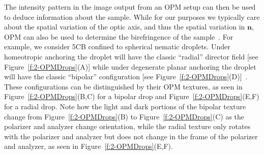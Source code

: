 The intensity pattern in the image output from an OPM setup can then be used to deduce information about the sample.
While for our purposes we typically care about the spatial variation of the optic axis, and thus the spatial variation in $\mathbf{n}$, OPM can also be used to determine the birefringence of the sample~\cite{RN232}.
For example, we consider 5CB confined to spherical nematic droplets.
Under homeotropic anchoring the droplet will have the classic ``radial'' director field [see Figure~\ref{f:2-OPMDrops}(A)] while under degenerate planar anchoring the droplet will have the classic ``bipolar'' configuration [see Figure~\ref{f:2-OPMDrops}(D)]~\cite{RN177}.
These configurations can be distinguished by their OPM textures, as seen in Figure~\ref{f:2-OPMDrops}(B,C) for a bipolar drop and Figure~\ref{f:2-OPMDrops}(E,F) for a radial drop.
Note how the light and dark portions of the bipolar texture change from Figure~\ref{f:2-OPMDrops}(B) to Figure~\ref{f:2-OPMDrops}(C) as the polarizer and analyzer change orientation, while the radial texture only rotates with the polarizer and analyzer but does not change in the frame of the polarizer and analyzer, as seen in Figure~\ref{f:2-OPMDrops}(E,F).

